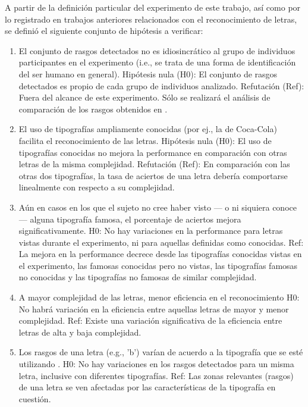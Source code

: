 \documentclass[runningheads,a4paper]{llncs}
\begin{document}
A partir de la definición particular del experimento de este trabajo, así como por lo registrado en trabajos anteriores relacionados con el reconocimiento de letras, se definió el siguiente conjunto de hipótesis a verificar:
\begin{enumerate}
 \item El conjunto de rasgos detectados no es idiosincrático al grupo de individuos participantes en el experimento (i.e., se trata de una forma de identificación del ser humano en general).
    \subitem Hipótesis nula (H0): El conjunto de rasgos detectados es propio de cada grupo de individuos analizado. 
    \subitem Refutación (Ref): Fuera del alcance de este experimento. Sólo se realizará el análisis de comparación de los rasgos obtenidos en \cite{FisetEtAl08:BubblesForLetters}.
 \item El uso de tipografías ampliamente conocidas (por ej., la de Coca-Cola) facilita el reconocimiento de las letras.
    \subitem Hipótesis nula (H0): El uso de tipografías conocidas no mejora la performance en comparación con otras letras de la misma complejidad.
    \subitem Refutación (Ref): En comparación con las otras dos tipografías, la tasa de aciertos de una letra debería comportarse linealmente con respecto a su complejidad.
 \item Aún en casos en los que el sujeto no cree haber visto --- o ni siquiera conoce --- alguna tipografía famosa, el porcentaje de aciertos mejora significativamente.
    \subitem H0: No hay variaciones en la performance para letras vistas durante el experimento, ni para aquellas definidas como conocidas.
    \subitem Ref: La mejora en la performance decrece desde las tipografías conocidas vistas en el experimento, las 
	    famosas conocidas pero no vistas, las tipografías famosas no conocidas y las tipografías no famosas de similar complejidad.
 \item A mayor complejidad de las letras, menor eficiencia en el reconocimiento \cite{PelliEtAl06:LetterIdentification}
    \subitem H0: No habrá variación en la eficiencia entre aquellas letras de mayor y menor complejidad.
    \subitem Ref: Existe una variación significativa de la eficiencia entre letras de alta y baja complejidad.
 \item Los rasgos de una letra (e.g., 'b') varían de acuerdo a la tipografía que se esté utilizando \cite{PelliEtAl06:LetterIdentification}.
    \subitem H0: No hay variaciones en los rasgos detectados para un misma letra, inclusive con diferentes tipografías.
    \subitem Ref: Las zonas relevantes (rasgos) de una letra se ven afectadas por las características de la tipografía en cuestión.

\end{enumerate}
\end{document}
